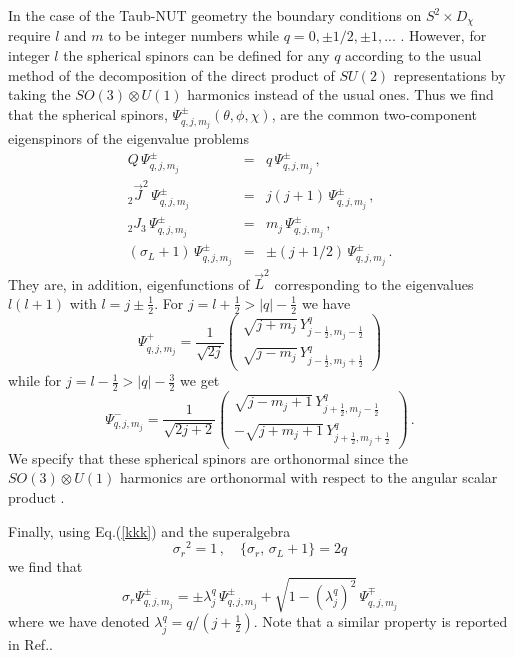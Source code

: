 \documentclass[a4paper,12pt]{article}
\begin{document}
In the case of the Taub-NUT geometry the boundary conditions on 
$S^{2}\times D_{\chi}$ require $l$ and $m$ to be integer numbers while $q=0,\pm 
1/2,\pm 1,...$ \cite{G2}. However, for integer $l$ the spherical spinors 
can be defined for any  $q$ according to the usual method of the decomposition 
of the direct product of $SU(2)$  representations  by  taking the 
$SO(3)\otimes U(1)$ harmonics instead of the usual ones. Thus we find that the 
spherical spinors,  $\Psi^{\pm}_{q,j,m_{j}}(\theta,\phi,\chi)$, 
are the common two-component eigenspinors of the eigenvalue problems  
\begin{eqnarray}
Q\,\Psi^{\pm}_{q,j,m_{j}}&=& q\,\Psi^{\pm}_{q,j,m_{j}}\,, \\
{_2}\vec{J}^{2}\,\Psi^{\pm}_{q,j,m_{j}}&=& j(j+1)\,\Psi^{\pm}_{q,j,m_{j}}
\,, \\
{_{2}}J_{3}\,\Psi^{\pm}_{q,j,m_{j}}&=& m_{j}\,\Psi^{\pm}_{q,j,m_{j}}\,, \\
(\sigma_{L}+1)\,\Psi^{\pm}_{q,j,m_{j}}&=& \pm(j+1/2)\,
\Psi^{\pm}_{q,j,m_{j}}\,.\label{kkk}  
\end{eqnarray}
They are, in addition, eigenfunctions of ${\vec{L}}^{2}$ corresponding to the 
eigenvalues $l(l+1)$ with $l=j\pm\frac{1}{2}$. For $j=l+\frac{1}{2}
>|q|-\frac{1}{2}$ we have 
\cite{TH,CV}  
\begin{equation}
\Psi^{+}_{q,j,m_{j}}=\frac{1}{\sqrt{2j}}\left(
\begin{array}{l}
\sqrt{j+m_{j}}\, Y^{q}_{j-\frac{1}{2},m_{j}-\frac{1}{2}}\\
\sqrt{j-m_{j}}\, Y^{q}_{j-\frac{1}{2},m_{j}+\frac{1}{2}}
\end{array}\right)
\end{equation}
while for $j=l-\frac{1}{2}>|q|-\frac{3}{2}$ we get
\begin{equation}
\Psi^{-}_{q,j,m_{j}}
=\frac{1}{\sqrt{2j+2}}\left(
\begin{array}{l}
\sqrt{j-m_{j}+1}\, Y^{q}_{j+\frac{1}{2},m_{j}-\frac{1}{2}}\\
-\sqrt{j+m_{j}+1}\, Y^{q}_{j+\frac{1}{2},m_{j}+\frac{1}{2}}
\end{array}\right)\,.
\end{equation}
We specify that these spherical spinors  are orthonormal since the 
$SO(3)\otimes U(1)$ harmonics are orthonormal with respect to the 
angular scalar product \cite{CV}.  

Finally, using Eq.(\ref{kkk}) and the superalgebra
\begin{equation}
{\sigma_{r}}^{2}=1\,,\quad \{\sigma_{r},\,\sigma_{L}+1\}=2q
\end{equation}
we find that    
\begin{equation}\label{pmmp}
\sigma_{r}\Psi^{\pm}_{q,j,m_{j}}=
\pm\lambda^{q}_{j}\,\Psi^{\pm}_{q,j,m_{j}}
+\sqrt{1-(\lambda^{q}_{j})^{2}}\,\Psi^{\mp}_{q,j,m_{j}}
\end{equation}
where we have denoted $\lambda^{q}_{j}=q/(j+\frac{1}{2})$. Note that a 
similar property is reported in Ref.\cite{HARM1}.
\end{document}
